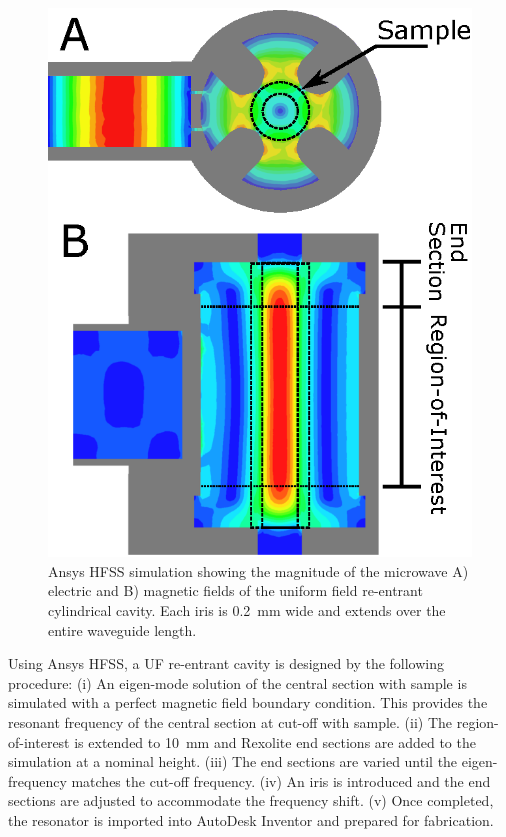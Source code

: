 \begin{figure}[htp]\centering
 \includegraphics{Kapitel/Ch2-Images/03-TE01UEMFields.eps}
 \caption[Simulation of the microwave fields.]{Ansys HFSS simulation showing the magnitude of the microwave A) electric and B) magnetic fields of the uniform field re-entrant cylindrical \cylTE{} cavity. Each iris is 0.2~mm wide and extends over the entire waveguide length.}
 \label{Ch2-fig:EMFields}
\end{figure}

Using Ansys HFSS, a UF re-entrant \cylTE{} cavity is designed by the following procedure: (i) An eigen-mode solution of the central section with sample is simulated with a perfect magnetic field boundary condition. This provides the resonant frequency of the central section at cut-off with sample. (ii) The region-of-interest is extended to 10~mm and Rexolite end sections are added to the simulation at a nominal height. (iii) The end sections are varied until the eigen-frequency matches the cut-off frequency. (iv) An iris is introduced and the end sections are adjusted to accommodate the frequency shift. (v) Once completed, the resonator is imported into AutoDesk Inventor and prepared for fabrication. 

